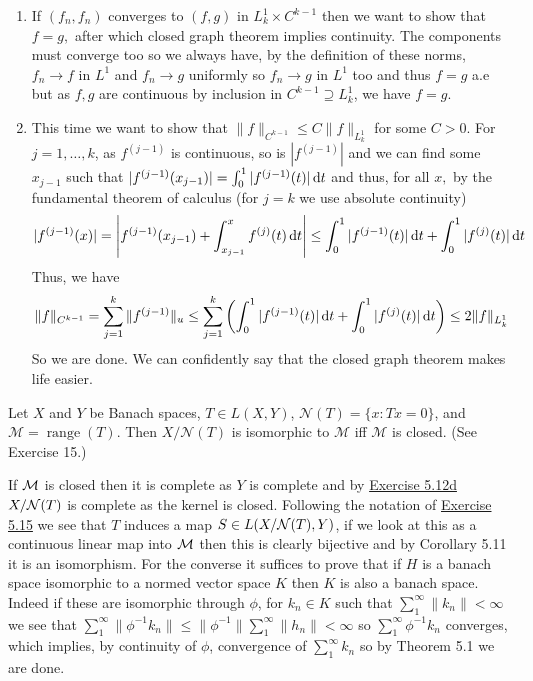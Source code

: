 \documentclass[12pt,a4paper]{article}
\begin{document}
\begin{solution}
    \begin{enumerate}[label=\alph*.]
        \item If $(f_n,f_n)$ converges to $(f,g)$ in $L_k^1\times C^{k-1}$ then we want to show that $f=g,$ after which closed graph theorem implies continuity. 
            The components must converge too so we always have, by the definition of these norms, $f_n\to f$ in $L^1$ and $f_n\to g$ uniformly so $f_n\to g$ in $L^1$ too and thus $f=g$ a.e but as $f,g$ are continuous by inclusion in $C^{k-1} \supseteq L_k^1$, we have $f=g.$ 
        \item This time we want to show that $\|f\|_{C^{k-1}}\leq C\|f\|_{L_k^1}$ for some $C>0.$
            For $j=1,\ldots,k$, as $f^{(j-1)}$ is continuous, so is $|f^{(j-1)}|$ and we can find some $x_{j-1}$ such that $|f^{(j-1)}(x_{j-1})|=\int_0^1|f^{(j-1)}(t)|\,\mathrm{d} t$ and thus, for all $x,$ by the fundamental theorem of calculus (for $j=k$ we use absolute continuity) 
            \[
                |f^{(j-1)}(x)|=\qty|f^{(j-1)}(x_{j-1})+\int_{x_{j-1}}^xf^{(j)}(t)\,\mathrm{d} t|\leq\int_0^1|f^{(j-1)}(t)|\,\mathrm{d} t+\int_0^1|f^{(j)}(t)|\,\mathrm{d} t
            \]
            Thus, we have 
            \[
                \|f\|_{C^{k-1}}=\sum_{j=1}^k\|f^{(j-1)}\|_u\leq\sum_{j=1}^k\qty(\int_0^1|f^{(j-1)}(t)|\,\mathrm{d} t+\int_0^1|f^{(j)}(t)|\,\mathrm{d} t)\leq 2\|f\|_{L_k^1}
            \]
            So we are done. 
            We can confidently say that the closed graph theorem makes life easier. 
    \end{enumerate}
\end{solution}
\begin{problem}\label{prob:5-35}
Let $X$ and $Y$ be Banach spaces, $T \in L(X,Y)$, $\mathcal{N}(T) = \{x : Tx = 0\}$, and $\mathcal{M} = \operatorname{range}(T)$. Then $X/\mathcal{N}(T)$ is isomorphic to $\mathcal{M}$ iff $\mathcal{M}$ is closed. (See Exercise 15.)
\end{problem}
\begin{solution}
    If $\mathcal{M}$ is closed then it is complete as $Y$ is complete and by \hyperref[prob:5-12]{Exercise 5.12d} $X/\mathcal{N}(T)$ is complete as the kernel is closed. 
    Following the notation of \hyperref[prob:5-15]{Exercise 5.15} we see that $T$ induces a map $S\in L(X/\mathcal{N}(T),Y)$, if we look at this as a continuous linear map into $\mathcal{M}$ then this is clearly bijective and by Corollary 5.11 it is an isomorphism. 
    For the converse it suffices to prove that if $H$ is a banach space isomorphic to a normed vector space $K$ then $K$ is also a banach space. 
    Indeed if these are isomorphic through $\phi$, for $k_n\in K$ such that $\sum_1^\infty\|k_n\|<\infty$ we see that $\sum_1^\infty\|\phi^{-1}k_n\|\leq\|\phi^{-1}\|\sum_1^\infty\|h_n\|<\infty$ so $\sum_1^\infty\phi^{-1}k_n$ converges, which implies, by continuity of $\phi$, convergence of $\sum_1^\infty k_n$ so by Theorem 5.1 we are done.  
\end{solution}
\end{document}
